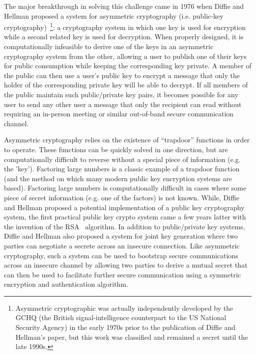 The major breakthrough in solving this challenge came in 1976 when
Diffie and Hellman proposed a system for asymmetric cryptography
(i.e. public-key cryptography)~\cite{diffie1976}\footnote{Asymmetric
  cryptographic was actually independently developed by the GCHQ (the
  British signal-intelligence counterpart to the US National Security
  Agency) in the early 1970s prior to the publication of Diffie and
  Hellman's paper, but this work was classified and remained a secret
  until the late 1990s.}: a cryptography system in which one key is
used for encryption while a second related key is used for
decryption. When properly designed, it is computationally infeasible
to derive one of the keys in an asymmetric cryptography system from
the other, allowing a user to publish one of their keys for public
consumption while keeping the corresponding key private. A member of
the public can then use a user's public key to encrypt a message that
only the holder of the corresponding private key will be able to
decrypt. If all members of the public maintain such public/private key
pairs, it becomes possible for any user to send any other user a
message that only the recipient can read without requiring an
in-person meeting or similar out-of-band secure communication channel.

Asymmetric cryptography relies on the existence of ``trapdoor''
functions in order to operate. These functions can be quickly solved
in one direction, but are computationally difficult to reverse without
a special piece of information (e.g. the 'key'). Factoring large
numbers is a classic example of a trapdoor function (and the method on
which many modern public key encryption systems are based). Factoring
large numbers is computationally difficult in cases where some piece
of secret information (e.g. one of the factors) is not known. While,
Diffie and Hellman proposed a potential implementation of a public key
cryptography system, the first practical public key crypto system came
a few years latter with the invention of the RSA~\cite{rivest1978}
algorithm. In addition to public/private key systems, Diffie and
Hellman also proposed a system for joint key generation where two
parties can negotiate a secrete across an insecure connection. Like
asymmetric cryptography, such a system can be used to bootstrap secure
communications across an insecure channel by allowing two parties to
derive a mutual secret that can then be used to facilitate further
secure communication using a symmetric encryption and authentication
algorithm.

